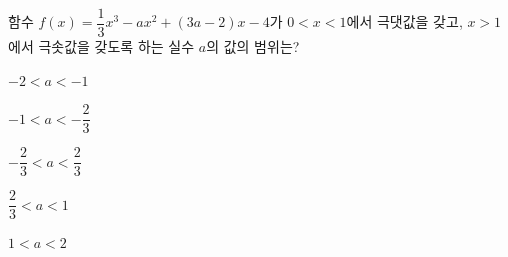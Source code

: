 함수 $f(x)=\dfrac{1}{3}x^3-ax^2+(3a-2)x-4$가 $0<x<1$에서 극댓값을 갖고, $x>1$에서 극솟값을 갖도록 하는 실수 $a$의 값의 범위는?
\begin{choicesii}{\rule[-3ex]{0pt}{8ex}$-2<a<-1$}{\rule[-3ex]{0pt}{8ex}$-1<a<-\dfrac{2}{3}$}{\rule[-3ex]{0pt}{8ex}$-\dfrac{2}{3}<a<\dfrac{2}{3}$}{\rule[-3ex]{0pt}{8ex}$\dfrac{2}{3}<a<1$}{\rule[-3ex]{0pt}{8ex}$1<a<2$}\end{choicesii}
